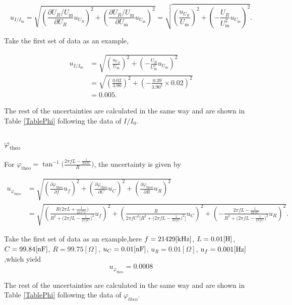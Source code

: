 \documentclass{article}
\begin{document}
$$u_{I/I_\text{m}} = \sqrt{(\frac{\partial U_R/U_\text{m}}{\partial U_R}u_{U_R})^2 + (\frac{\partial U_R/U_\text{m}}{\partial U_\text{m}}u_{U_\text{m}})^2} = \sqrt{(\frac{u_{U_R}}{U_\text{m}})^2 + (-\frac{U_R}{U_\text{m}^2}u_{U_\text{m}})^2}.$$

Take the first set of data as an example,

\begin{align*}
    u_{I/I_\text{m}} & = \sqrt{(\frac{u_{U_R}}{U_\text{m}})^2 + (-\frac{U_R}{U_\text{m}^2}u_{U_\text{m}})^2} \\
                     & = \sqrt{(\frac{0.02}{3.90})^2 + (-\frac{0.39}{3.90^2}\times 0.02)^2}                 \\
                     & = 0.005.
\end{align*}

The rest of the uncertainties are calculated in the same way and are shown in Table \ref{TablePhi} following the data of $I/I_0$.

\subsubsection{$\varphi_\text{theo}$}
For $\varphi_\text{theo} = \tan^{-1}\bigg(\frac{2\pi fL-\frac{1}{2\pi fC}}{R}\bigg)$, the uncertainty is given by 

\begin{align*}
    u_{\varphi_\text{theo}} & = \sqrt{(\frac{\partial \varphi_\text{theo}}{\partial f}u_f)^2 + (\frac{\partial \varphi_\text{theo}}{\partial C}u_C)^2 + (\frac{\partial \varphi_\text{theo}}{\partial R}u_R)^2}                                                                                                                                               \\
                            & = \sqrt{\left( \frac{R\big(2\pi L +\frac{1}{2\pi f^2 C}\big)}{R^2 + \big(2\pi fL - \frac{1}{2\pi fC}\big)^2} u_f \right)^2 + \left( \frac{R}{2\pi fC^2\big[R^2+\big(2\pi fL - \frac{1}{2\pi fC}\big)^2\big]} u_C \right)^2 + \left(-\frac{2\pi fL-\frac{1}{2\pi fC}}{R^2+\big(2\pi fL-\frac{1}{2\pi fC}\big)^2} u_R \right)^2}.
\end{align*}

Take the first set of data as an example,here $f=21429[\rm kHz]$, $L=0.01[\rm H]$, $C=99.84[\rm nF]$, $R=99.75[\Omega]$, $u_C=0.01[\rm nF]$, $u_R=0.01[\Omega]$, $u_f=0.001[\rm Hz]$,which yield
$$u_{\varphi_\text{theo}} = 0.0008$$

The rest of the uncertainties are calculated in the same way and are shown in Table \ref{TablePhi} following the data of $\varphi_{theo}$.
\end{document}
